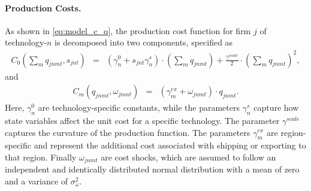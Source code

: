 \documentclass[12pt, letter]{article}
\begin{document}

\paragraph{Production Costs.} 
As shown in \eqref{eq:model_c_q}, the production cost function for firm $j$ of technology-$n$ is decomposed into two components, specified as
\begin{eqnarray*}
   C_0\!\left(\sum_m q_{jnmt},s_{jnt}\right) &=& (\gamma_{n}^0 + s_{jnt} \gamma_n^s) \cdot (\sum_m q_{jnmt}) + \frac{\gamma^{scale}}{2} \cdot (\sum_m q_{jnmt})^2,
\end{eqnarray*}
and
\begin{eqnarray*}
   C_m(q_{jnmt},\omega_{jnmt}) &=& (\gamma_{m}^{ex}+\omega_{jnmt}) \cdot q_{jnmt}.
\end{eqnarray*}
Here, $\gamma_{n}^0$ are technology-specific constants, while the parameters $\gamma_n^s$ capture how state variables affect the unit cost for a specific technology. The parameter $\gamma^{scale}$ captures the curvature of the production function. The parameters $\gamma_{m}^{ex}$ are region-specific and represent the additional cost associated with shipping or exporting to that region. Finally $\omega_{jnmt}$ are cost shocks, which are assumed to follow an independent and identically distributed normal distribution with a mean of zero and a variance of $\sigma_\omega^2$.
\end{document}
